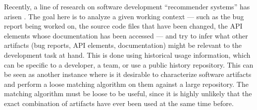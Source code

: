 Recently, a line of research on software development ``recommender
systems'' has arisen \cite{CubranicMSB05,HolmesW10,KerstenM05,RobillardWZ10}.  The
goal here is to analyze a given working context --- such as the bug report
being worked on, the source code files that have been changed, the API
elements whose documentation has been accessed --- and try to infer what
other artifacts (bug reports, API elements, documentation) might be
relevant to the development task at hand.  This is done using historical
usage information, which can be specific to a developer, a team, or
use a public history repository.  This can be seen as another instance
where is it desirable to characterize software artifacts and perform a
loose matching algorithm on them against a large repository.  The matching
algorithm must be loose to be useful, since it is highly unlikely that the
exact combination of artifacts have ever been used at the same time before.






